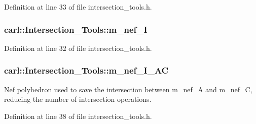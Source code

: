 Definition at line 33 of file intersection\+\_\+tools.\+h.

\hypertarget{classcarl_1_1_intersection___tools_a47353dc1c374f45bf3dbaae667270cf3}{}
\subsubsection[{m\+\_\+nef\+\_\+\+I}]{ carl\+::\+Intersection\+\_\+\+Tools\+::m\+\_\+nef\+\_\+\+I\hspace{0.3cm}{\ttfamily [protected]}}\label{classcarl_1_1_intersection___tools_a47353dc1c374f45bf3dbaae667270cf3}


Definition at line 32 of file intersection\+\_\+tools.\+h.

\hypertarget{classcarl_1_1_intersection___tools_a8333f16787459e65c4fe913dad50b5c6}{}
\subsubsection[{m\+\_\+nef\+\_\+\+I\+\_\+\+A\+C}]{ carl\+::\+Intersection\+\_\+\+Tools\+::m\+\_\+nef\+\_\+\+I\+\_\+\+A\+C\hspace{0.3cm}{\ttfamily [protected]}}\label{classcarl_1_1_intersection___tools_a8333f16787459e65c4fe913dad50b5c6}


Nef polyhedron used to save the intersection between m\+\_\+nef\+\_\+\+A and m\+\_\+nef\+\_\+\+C, reducing the number of intersection operations. 



Definition at line 38 of file intersection\+\_\+tools.\+h.

\hypertarget{classcarl_1_1_intersection___tools_afe18e6ca5fd12bae08efb98f69c71a48}{}
